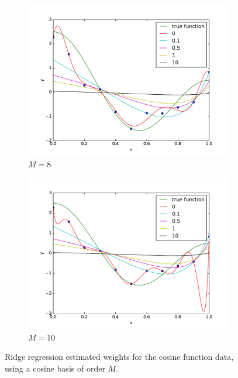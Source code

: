 \documentclass[10pt,psamsfonts]{amsart}
\theoremstyle{definition}
\theoremstyle{remark}
\numberwithin{equation}{section}
\begin{document}
\begin{figure}
\begin{subfigure}[b]{0.24\textwidth}
		\includegraphics[width=\textwidth]{hw1_3-1_8.pdf}
		\caption{$M=8$}
	\end{subfigure}
	\begin{subfigure}[b]{0.24\textwidth}
		\includegraphics[width=\textwidth]{hw1_3-1_10.pdf}
		\caption{$M=10$}
	\end{subfigure}
	\caption{Ridge regression estimated weights for the cosine function data, using a cosine basis of order $M$.}
\end{figure}
\end{document}
